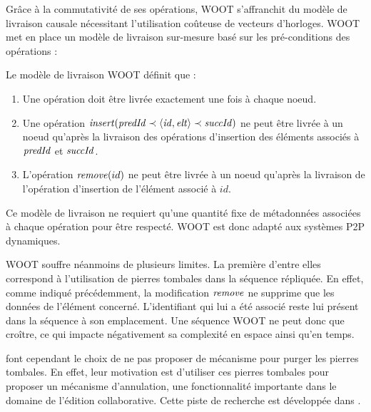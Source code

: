 Grâce à la commutativité de ses opérations, WOOT s'affranchit du modèle de livraison causale nécessitant l'utilisation coûteuse de vecteurs d'horloges.
WOOT met en place un modèle de livraison sur-mesure basé sur les pré-conditions des opérations :
\begin{definition}
  Le modèle de livraison WOOT définit que :
  \begin{enumerate}
    \item Une opération doit être livrée exactement une fois à chaque noeud\footnotemark.
    \item Une opération $\mathit{insert}(\mathit{predId} \prec \langle \mathit{id},\mathit{elt} \rangle \prec \mathit{succId})$ ne peut être livrée à un noeud qu'après la livraison des opérations d'insertion des éléments associés à $\mathit{predId}$ et $\mathit{succId}$.
    \item L'opération $\mathit{remove}(id)$ ne peut être livrée à un noeud qu'après la livraison de l'opération d'insertion de l'élément associé à $id$.
  \end{enumerate}
\end{definition}
Ce modèle de livraison ne requiert qu'une quantité fixe de métadonnées associées à chaque opération pour être respecté.
WOOT est donc adapté aux systèmes \ac{P2P} dynamiques.

WOOT souffre néanmoins de plusieurs limites.
La première d'entre elles correspond à l'utilisation de pierres tombales dans la séquence répliquée.
En effet, comme indiqué précédemment, la modification $\mathit{remove}$ ne supprime que les données de l'élément concerné.
L'identifiant qui lui a été associé reste lui présent dans la séquence à son emplacement.
Une séquence WOOT ne peut donc que croître, ce qui impacte négativement sa complexité en espace ainsi qu'en temps.

\textcite{2006-woot-oster} font cependant le choix de ne pas proposer de mécanisme pour purger les pierres tombales.
En effet, leur motivation est d'utiliser ces pierres tombales pour proposer un mécanisme d'annulation, une fonctionnalité importante dans le domaine de l'édition collaborative.
Cette piste de recherche est développée dans \cite{2009-undo-p2p-semantic-wikis-rahhal}.

